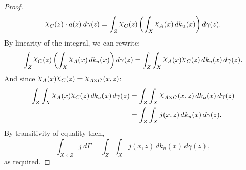 \documentclass[
twoside=true,
paper=letter,
fontsize=9pt,
pagesize=auto,
leqno,
openany,
headsepline,
overfullrule,
]{scrbook}
\theoremstyle{plain}
\theoremstyle{plain}
\theoremstyle{definition}
\theoremstyle{bfnoteitalic}
\theoremstyle{bfnoteroman}
\newcommand{\charfunction}[1]{{\raisebox{2pt}{$\chi$}}_{#1}}
\newcommand{\funcj}{j}
\newcommand{\funck}{k}
\newcommand{\measurespace}{X}
\newcommand{\measurespaceiii}{Z}
\newcommand{\mspaceelt}{x}
\newcommand{\mspaceeltiii}{z}
\newcommand{\seti}{A}
\newcommand{\setiii}{C}
\newcommand{\uspaceelt}{u}
\newcommand{\measonprod}{\Gamma}%
\newcommand{\marginalthree}{\gamma}
\begin{document}
\begin{proof}
\[\charfunction{\setiii}(\mspaceeltiii)
\cdot
a(\mspaceeltiii)\, d\marginalthree(\mspaceeltiii)
=
\int_\measurespaceiii
\charfunction{\setiii}(\mspaceeltiii)
\left(\int_\measurespace
\charfunction{\seti} (\mspaceelt)
\, d\funck_\uspaceelt (\mspaceelt)\right)
   d\marginalthree (\mspaceeltiii).
\]
By linearity of the integral, we can rewrite:
\[
\int_\measurespaceiii
\charfunction{\setiii}(\mspaceeltiii)
\left(\int_\measurespace
\charfunction{\seti} (\mspaceelt)
\, d\funck_\uspaceelt (\mspaceelt)\right)
   d\marginalthree (\mspaceeltiii)
=
\int_\measurespaceiii
\int_\measurespace
\charfunction{\seti} (\mspaceelt)
\charfunction{\setiii}(\mspaceeltiii)
\, d\funck_\uspaceelt (\mspaceelt)
\, d\marginalthree (\mspaceeltiii).
\]
And since
$\charfunction{\seti} (\mspaceelt)
\charfunction{\setiii}(\mspaceeltiii)
=
\charfunction{\seti\times\setiii}(\mspaceelt,\mspaceeltiii)$:
\begin{align*}
\int_\measurespaceiii
\int_\measurespace
\charfunction{\seti} (\mspaceelt)
\charfunction{\setiii}(\mspaceeltiii)
\, d\funck_\uspaceelt (\mspaceelt)
\, d\marginalthree (\mspaceeltiii)
& =
\int_\measurespaceiii
\int_\measurespace
\charfunction{\seti\times\setiii}
(\mspaceelt,\mspaceeltiii)
\, d\funck_\uspaceelt (\mspaceelt)
\, d\marginalthree (\mspaceeltiii) \\
& =
\int_\measurespaceiii
\int_\measurespace
\funcj (\mspaceelt,\mspaceeltiii)
\, d\funck_\uspaceelt (\mspaceelt)
\, d\marginalthree (\mspaceeltiii).
\end{align*}
By transitivity of equality then,
\[
\int_{\measurespace\times\measurespaceiii}
\funcj
\, d\measonprod
=
\int_\measurespaceiii
\int_\measurespace
\funcj (\mspaceelt,\mspaceeltiii)
\, d\funck_\uspaceelt (\mspaceelt)
\, d\marginalthree (\mspaceeltiii),
\]
as required.
\end{proof}
\end{document}
